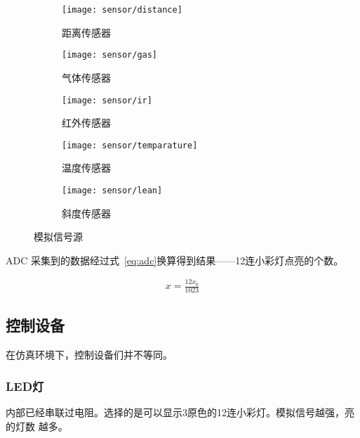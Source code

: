 \documentclass[../main]{subfiles}
\begin{document}
\begin{figure}[htpb]
  \centering
  \begin{subfigure}[htbp]{0.28\linewidth}
    \centering
    \texttt{[image: sensor/distance]}
    \caption{距离传感器}%
    \label{fig:sensor/distance}
  \end{subfigure}
  \quad
  \begin{subfigure}[htbp]{0.28\linewidth}
    \centering
    \texttt{[image: sensor/gas]}
    \caption{气体传感器}%
    \label{fig:sensor/gas}
  \end{subfigure}

  \begin{subfigure}[htbp]{0.28\linewidth}
    \centering
    \texttt{[image: sensor/ir]}
    \caption{红外传感器}%
    \label{fig:sensor/ir}
  \end{subfigure}
  \quad
  \begin{subfigure}[htbp]{0.28\linewidth}
    \centering
    \texttt{[image: sensor/temparature]}
    \caption{温度传感器}%
    \label{fig:sensor/temparature}
  \end{subfigure}

  \begin{subfigure}[htbp]{0.34\linewidth}
    \centering
    \texttt{[image: sensor/lean]}
    \caption{斜度传感器}%
    \label{fig:sensor/lean}
  \end{subfigure}
  \caption{模拟信号源}%
  \label{fig:anaolog}
\end{figure}

ADC 采集到的数据经过式~\ref{eq:adc}换算得到结果——12连小彩灯点亮的个数。

\begin{align}
  \label{eq:adc}
  x = \frac{12x_0}{1023}
\end{align}

\subsection{控制设备}%
\label{sub:control}

在仿真环境下，控制设备们并不等同。

\subsubsection{LED灯}%
\label{ssub:led}

内部已经串联过电阻。选择的是可以显示3原色的12连小彩灯。模拟信号越强，亮的灯数
越多。
\end{document}
